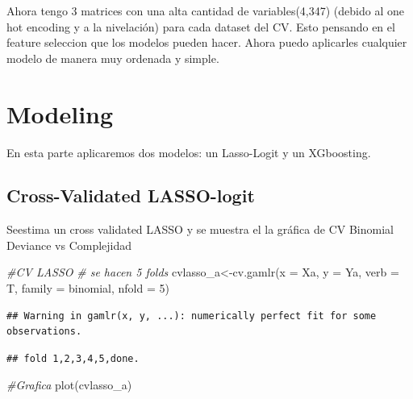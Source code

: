 \documentclass[
]{article}
\newenvironment{Shaded}{\begin{snugshade}}{\end{snugshade}}
\newcommand{\AttributeTok}[1]{\textcolor[rgb]{0.77,0.63,0.00}{#1}}
\newcommand{\CommentTok}[1]{\textcolor[rgb]{0.56,0.35,0.01}{\textit{#1}}}
\newcommand{\DecValTok}[1]{\textcolor[rgb]{0.00,0.00,0.81}{#1}}
\newcommand{\FunctionTok}[1]{\textcolor[rgb]{0.00,0.00,0.00}{#1}}
\newcommand{\NormalTok}[1]{#1}
\newcommand{\OtherTok}[1]{\textcolor[rgb]{0.56,0.35,0.01}{#1}}
\newcommand{\StringTok}[1]{\textcolor[rgb]{0.31,0.60,0.02}{#1}}
\begin{document}
Ahora tengo 3 matrices con una alta cantidad de variables(4,347) (debido
al one hot encoding y a la nivelación) para cada dataset del CV. Esto
pensando en el feature seleccion que los modelos pueden hacer. Ahora
puedo aplicarles cualquier modelo de manera muy ordenada y simple.

\hypertarget{modeling}{%
\section{Modeling}\label{modeling}}

En esta parte aplicaremos dos modelos: un Lasso-Logit y un XGboosting.

\hypertarget{cross-validated-lasso-logit}{%
\subsection{Cross-Validated
LASSO-logit}\label{cross-validated-lasso-logit}}

Seestima un cross validated LASSO y se muestra el la gráfica de CV
Binomial Deviance vs Complejidad

\begin{Shaded}
\begin{Highlighting}[]
\CommentTok{\#CV LASSO}
\CommentTok{\# se hacen 5 folds }
\NormalTok{cvlasso\_a}\OtherTok{\textless{}{-}}\FunctionTok{cv.gamlr}\NormalTok{(}\AttributeTok{x =}\NormalTok{ Xa, }\AttributeTok{y =}\NormalTok{ Ya, }\AttributeTok{verb =}\NormalTok{ T, }\AttributeTok{family =} \StringTok{\textquotesingle{}binomial\textquotesingle{}}\NormalTok{, }\AttributeTok{nfold =} \DecValTok{5}\NormalTok{)}
\end{Highlighting}
\end{Shaded}

\begin{verbatim}
## Warning in gamlr(x, y, ...): numerically perfect fit for some observations.
\end{verbatim}

\begin{verbatim}
## fold 1,2,3,4,5,done.
\end{verbatim}

\begin{Shaded}
\begin{Highlighting}[]
\CommentTok{\#Grafica}
\FunctionTok{plot}\NormalTok{(cvlasso\_a)}
\end{Highlighting}
\end{Shaded}
\end{document}
